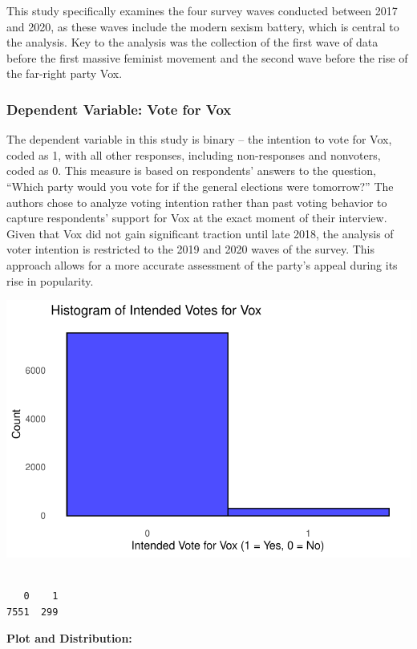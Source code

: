 \documentclass[
  letterpaper,
  DIV=11,
  numbers=noendperiod]{scrartcl}
\begin{document}
This study specifically examines the four survey waves conducted between
2017 and 2020, as these waves include the modern sexism battery, which
is central to the analysis. Key to the analysis was the collection of
the first wave of data before the first massive feminist movement and
the second wave before the rise of the far-right party Vox.

\subsubsection{Dependent Variable: Vote for
Vox}\label{dependent-variable-vote-for-vox}

The dependent variable in this study is binary -- the intention to vote
for Vox, coded as 1, with all other responses, including non-responses
and nonvoters, coded as 0. This measure is based on respondents' answers
to the question, ``Which party would you vote for if the general
elections were tomorrow?'' The authors chose to analyze voting intention
rather than past voting behavior to capture respondents' support for Vox
at the exact moment of their interview. Given that Vox did not gain
significant traction until late 2018, the analysis of voter intention is
restricted to the 2019 and 2020 waves of the survey. This approach
allows for a more accurate assessment of the party's appeal during its
rise in popularity.

\includegraphics{reprod_sexism_files/figure-pdf/unnamed-chunk-3-1.pdf}

\begin{verbatim}

   0    1 
7551  299 
\end{verbatim}

\textbf{Plot and Distribution:}
\end{document}
